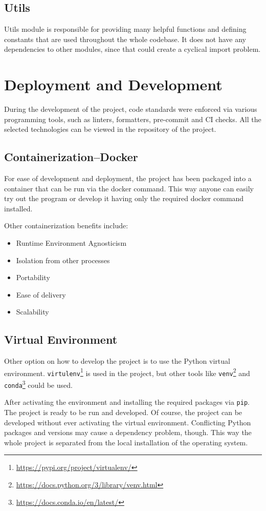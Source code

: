 \subsection*{Utils}
Utils module is responsible for providing many helpful functions and defining constants that are used throughout the whole codebase. It does not have any dependencies to other modules, since that could create a cyclical import problem.

\section{Deployment and Development}
During the development of the project, code standards were enforced via various programming tools, such as linters, formatters, pre-commit and CI checks. All the selected technologies can be viewed in the repository of the project.

\subsection*{Containerization--Docker}
For ease of development and deployment, the project has been packaged into a container that can be run via the docker command. This way anyone can easily try out the program or develop it having only the required docker command installed.

Other containerization benefits include:
\begin{itemize}
    \item Runtime Environment Agnosticism
    \item Isolation from other processes
    \item Portability
    \item Ease of delivery
    \item Scalability
\end{itemize}

\subsection*{Virtual Environment}
Other option on how to develop the project is to use the Python virtual environment. \texttt{virtulenv}\footnote{\url{https://pypi.org/project/virtualenv/}} is used in the project, but other tools like \texttt{venv}\footnote{\url{https://docs.python.org/3/library/venv.html}} and \texttt{conda}\footnote{\url{https://docs.conda.io/en/latest/}} could be used.

After activating the environment and installing the required packages via \texttt{pip}. The project is ready to be run and developed. Of course, the project can be developed without ever activating the virtual environment. Conflicting Python packages and versions may cause a dependency problem, though. This way the whole project is separated from the local installation of the operating system.

